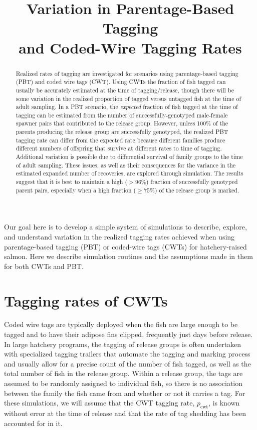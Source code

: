 \documentclass[11pt]{article}
\title{Variation in Parentage-Based Tagging \\
and Coded-Wire  Tagging  Rates}
\begin{document}
\maketitle


\begin{abstract}
Realized rates of tagging are investigated for scenarios using parentage-based tagging (PBT)
and coded wire tags (CWT).  
Using CWTs the fraction of fish tagged can usually be accurately
estimated at the time of tagging/release, though there will be some variation in the realized
proportion of tagged versus untagged fish at the time of adult sampling.  In a PBT
scenario, the {\em expected} fraction of fish tagged at the time of tagging can be
estimated from the number of successfully-genotyped male-female spawner pairs that
contributed to the release group.  However, unless 100\% of the parents producing the release
group are successfully genotyped, the realized PBT tagging rate can differ from the
expected rate because different families produce different numbers of offspring that survive
at different rates to time of tagging.  Additional variation is possible due to differential
survival of family groups to the time of adult sampling.  These issues, as well as their
consequences for the variance in the estimated expanded number of recoveries, are explored
through simulation.  The results suggest that it is best to maintain a high ($>96\%$) fraction
of successfully genotyped parent pairs, especially when a high fraction ($\geq 75\%$) of the
release group is marked.

\end{abstract}


\tableofcontents

Our goal here is to develop a simple system of simulations to describe, explore, and understand
variation in the realized tagging rates achieved when using parentage-based tagging (PBT)
or coded-wire tags (CWTs) for hatchery-raised salmon.  Here we describe simulation routines
and the assumptions made in them for both CWTs and PBT.

\section{Tagging rates of CWTs}
Coded wire tags are typically deployed
when the fish are large enough to be tagged and to have their adipose fins clipped, frequently
just days before release.  In large hatchery programs, the tagging of release
groups is often undertaken with specialized tagging trailers that automate the tagging and marking
process and usually allow for a precise count of the number of fish tagged,
as well as the total number of fish in the release group.  Within a release group, the tags are
assumed to be randomly assigned to individual fish, so there is no association between the family
the fish came from and whether or not it carries a tag.  For these simulations, we will assume
that the CWT tagging rate, $p_\mathrm{cwt}$, is known without error at the time of release and that
the rate of tag shedding has been accounted for in it. 
\end{document}
